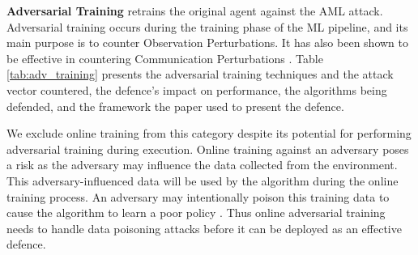 \documentclass[conference,compsoc]{IEEEtran}
\begin{document}

\noindent \textbf{Adversarial Training}
\cite{bai_recent_2021} retrains the original agent against the AML attack. Adversarial training occurs during the training phase of the ML pipeline, and its main purpose is to counter Observation Perturbations. It has also been shown to be effective in countering Communication Perturbations \cite{tu_adversarial_2021}. Table \ref{tab:adv_training} presents the adversarial training techniques and the attack vector countered, the defence's impact on  performance, the algorithms being defended, and the framework the paper used to present the defence.

We exclude online training from this category despite its potential for performing adversarial training during execution. Online training against an adversary poses a risk as the adversary may influence the data collected from the environment. This adversary-influenced data will be used by the algorithm during the online training process. An adversary may intentionally poison this training data to cause the algorithm to learn a poor policy \cite{kiourti_trojdrl_2020, han_adversarial_2020}. Thus online adversarial training  needs to handle data poisoning attacks before it can be deployed as an effective defence.
\end{document}
